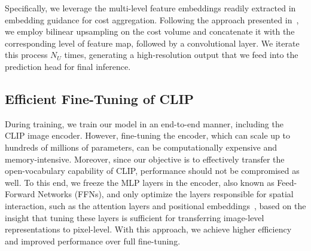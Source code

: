 \documentclass[10pt,twocolumn,letterpaper]{article}
\begin{document}
Specifically, we leverage the multi-level feature embeddings readily extracted in embedding guidance for cost aggregation. Following the approach presented in~\cite{hong2022cost}, we employ bilinear upsampling on the cost volume and concatenate it with the corresponding level of feature map, followed by a convolutional layer. We iterate this process $N_U$ times, generating a high-resolution output that we feed into the prediction head for final inference.

\subsection{Efficient Fine-Tuning of CLIP}
During training, we train our model in an end-to-end manner, including the CLIP image encoder. However, fine-tuning the encoder, which can scale up to hundreds of millions of parameters, can be computationally expensive and memory-intensive. Moreover, since our objective is to effectively transfer the open-vocabulary capability of CLIP, performance should not be compromised as well. To this end, we freeze the MLP layers in the encoder, also known as Feed-Forward Networks (FFNs), and only optimize the layers responsible for spatial interaction, such as the attention layers and positional embeddings~\cite{vaswani2017attention}, based on the insight that tuning these layers is sufficient for transferring image-level representations to pixel-level. With this approach, we achieve higher efficiency and improved performance over full fine-tuning.
\end{document}

